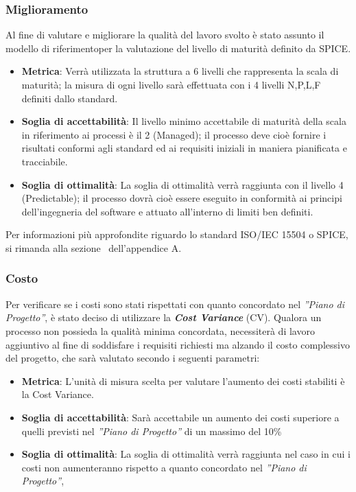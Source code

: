\subsubsection{Miglioramento}
Al fine di valutare e migliorare la qualità del lavoro svolto è stato assunto il modello di riferimentoper la valutazione del livello di maturità definito da SPICE.
\begin{itemize}
	\item \textbf{Metrica}: Verrà utilizzata la struttura a 6 livelli che rappresenta la scala di maturità; la misura di ogni livello sarà effettuata con i 4 livelli N,P,L,F definiti dallo standard.
	\item \textbf{Soglia di accettabilità}: Il livello minimo accettabile di maturità della scala in riferimento ai processi è il 2 (Managed); il processo deve cioè fornire i risultati conformi agli standard ed ai requisiti iniziali in maniera pianificata e tracciabile.
	\item \textbf{Soglia di ottimalità}: La soglia di ottimalità verrà raggiunta con il livello 4 (Predictable); il processo dovrà cioè essere eseguito in conformità ai principi dell'ingegneria del software e attuato all'interno di limiti ben definiti.
\end{itemize}

Per informazioni più approfondite riguardo lo standard ISO/IEC 15504 o SPICE, si rimanda alla sezione~ dell'appendice A.

\subsubsection{Costo}
Per verificare se i costi sono stati rispettati con quanto concordato nel  \emph{''Piano di Progetto''}, è stato deciso di utilizzare la \emph{\textbf{Cost Variance}} (CV).
Qualora un processo non possieda la qualità minima concordata, necessiterà di lavoro aggiuntivo al fine di soddisfare i requisiti richiesti ma alzando il costo complessivo del progetto, che sarà valutato secondo i seguenti parametri:
\begin{itemize}
	\item \textbf{Metrica}: L'unità di misura scelta per valutare l'aumento dei costi stabiliti è la Cost Variance.
	\item \textbf{Soglia di accettabilità}: Sarà accettabile un aumento dei costi superiore a quelli previsti nel \emph{''Piano di Progetto''} di un massimo del 10\%
	\item \textbf{Soglia di ottimalità}: La soglia di ottimalità verrà raggiunta nel caso in cui i costi non aumenteranno rispetto a quanto concordato nel \emph{''Piano di Progetto''}, 
\end{itemize}

